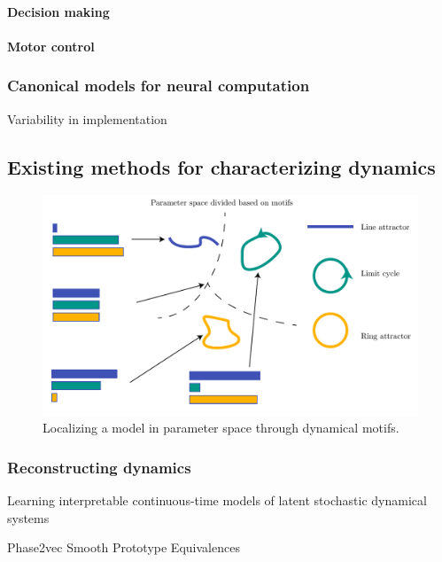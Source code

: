 \documentclass{article}
\theoremstyle{definition} \newtheorem{definition}{Definition}  \newtheorem{example}{Example}
\theoremstyle{remark} \newtheorem{remark}{Remark}
\newcounter{ct}
\begin{document}
\paragraph{Decision making}

\paragraph{Motor control}
\citep{wang2022representation}

\subsubsection{Canonical models for neural computation}
\citep{chirimuuta2014minimal}

Variability in implementation



\subsection{Existing methods for characterizing dynamics}

\begin{figure}[htbp]
    \centering
    \includegraphics[width=0.75\linewidth]{parameterspace_motifs}
    \caption{Localizing a model in parameter space through dynamical motifs.}
    \label{fig:ds_landscape}
\end{figure}

\subsubsection{Reconstructing dynamics}
Learning interpretable continuous-time models of latent stochastic dynamical systems \citep{duncker2019learning}

Phase2vec \citep{ricci2022phase2vec}
\citep{moriel2024timewarpattend}
Smooth Prototype Equivalences \citep{friedman2025characterizing}
\end{document}
